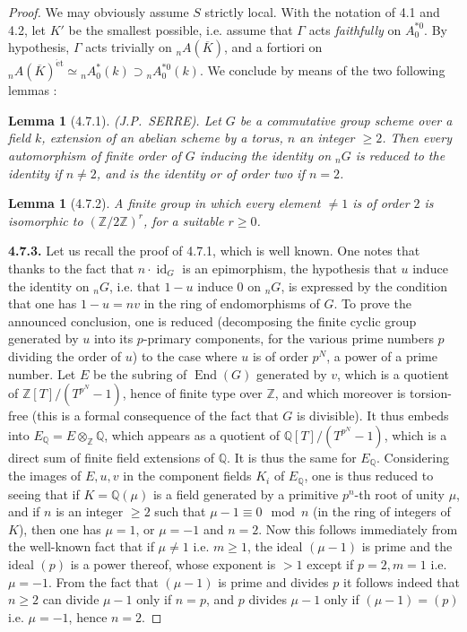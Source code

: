 \documentclass[11pt]{article}
\theoremstyle{plain}
\newtheorem{lemme}[theorem]{Lemma}
\theoremstyle{definition}
\theoremstyle{remark}
\newcommand{\QQ}{\mathbb Q}
\newcommand{\ZZ}{\mathbb Z}
\DeclareMathOperator{\End}{End}
\DeclareMathOperator{\id}{id}
\newcommand{\et}{\mathrm{\acute{e}t}}
\begin{document}
\begin{proof}
We may obviously assume $S$ strictly local. With the notation of 4.1 and
4.2, let $K'$ be the smallest possible, i.e. assume that $\Gamma$ acts
\emph{faithfully} on $A_0^{\ast 0}$. By hypothesis, $\Gamma$ acts
trivially on ${}_n A(\overline{K})$, and a fortiori on
${}_n A(\overline{K})^{\et} \simeq {}_n A_0^{\ast}(k) \supset
{}_n A_0^{\ast 0}(k)$. We conclude by means of the two following lemmas :

\begin{lemme}[4.7.1]
\emph{(J.P.~SERRE).} Let $G$ be a commutative group scheme over a field
$k$, extension of an abelian scheme by a torus, $n$ an integer $\geq 2$.
Then every automorphism of finite order of $G$ inducing the identity on
${}_n G$ is reduced to the identity if $n \neq 2$, and is the identity
or of order two if $n = 2$.
\end{lemme}

\begin{lemme}[4.7.2]
A finite group in which every element $\neq 1$ is of order $2$ is
isomorphic to $(\ZZ/2\ZZ)^r$, for a suitable $r \geq 0$.
\end{lemme}

\noindent\textbf{4.7.3.} Let us recall the proof of 4.7.1, which is well
known. One notes that thanks to the fact that $n \cdot \id_G$ is an
epimorphism, the hypothesis that $u$ induce the identity on ${}_n G$,
i.e. that $1 - u$ induce $0$ on ${}_n G$, is expressed by the condition
that one has $1 - u = nv$ in the ring of endomorphisms of $G$. To prove
the announced conclusion, one is reduced (decomposing the finite cyclic
group generated by $u$ into its $p$-primary components, for the various
prime numbers $p$ dividing the order of $u$) to the case where $u$ is of
order $p^N$, a power of a prime number. Let $E$ be the subring of
$\End(G)$ generated by $v$, which is a quotient of $\ZZ[T]/(T^{p^N} - 1)$,
hence of finite type over $\ZZ$, and which moreover is torsion-free
(this is a formal consequence of the fact that $G$ is divisible). It
thus embeds into $E_{\QQ} = E \otimes_{\ZZ} \QQ$, which appears as a
quotient of $\QQ[T]/(T^{p^N} - 1)$, which is a direct sum of finite field
extensions of $\QQ$. It is thus the same for $E_{\QQ}$. Considering the
images of $E, u, v$ in the component fields $K_i$ of $E_{\QQ}$, one is
thus reduced to seeing that if $K = \QQ(\mu)$ is a field generated by a
primitive $p^n$-th root of unity $\mu$, and if $n$ is an integer
$\geq 2$ such that $\mu - 1 \equiv 0 \mod n$ (in the ring of integers of
$K$), then one has $\mu = 1$, or $\mu = -1$ and $n = 2$. Now this
follows immediately from the well-known fact that if $\mu \neq 1$ i.e.
$m \geq 1$, the ideal $(\mu - 1)$ is prime and the ideal $(p)$ is a
power thereof, whose exponent is $> 1$ except if $p = 2, m = 1$ i.e.
$\mu = -1$. From the fact that $(\mu - 1)$ is prime and divides $p$ it
follows indeed that $n \geq 2$ can divide $\mu - 1$ only if $n = p$, and
$p$ divides $\mu - 1$ only if $(\mu - 1) = (p)$ i.e. $\mu = -1$, hence
$n = 2$.


\end{proof}
\end{document}
